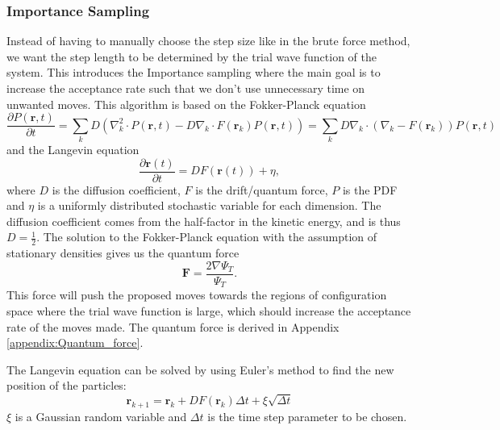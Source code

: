 \documentclass[12pt,a4paper,english]{article}
\begin{document}
\subsubsection{Importance Sampling}
\label{subsubsect:Importance}
Instead of having to manually choose the step size like in the brute force method, we want the step length to be determined by the trial wave function of the system. This introduces the Importance sampling where the main goal is to increase the acceptance rate such that we don't use unnecessary time on unwanted moves. This algorithm is based on the Fokker-Planck equation 
\begin{equation}
\label{eq:Fokker-Planck}
\frac{\partial P(\textbf{r},t)}{\partial t}=\sum_{k}D\left(\nabla_k^2\cdot P(\textbf{r},t)-D\nabla_k\cdot F(\textbf{r}_k)P(\textbf{r},t)\right)=\sum_{k}D\nabla_k\cdot(\nabla_k-F(\textbf{r}_k))P(\textbf{r},t)
\end{equation}
and the Langevin equation
\begin{equation}
\label{eq:Langevin}
\frac{\partial \textbf{r}(t)}{\partial t}=DF(\textbf{r}(t))+\eta,
\end{equation}
where $D$ is the diffusion coefficient, $F$ is the drift/quantum force, $P$ is the PDF and $\eta$ is a uniformly distributed stochastic variable for each dimension. The diffusion coefficient comes from the half-factor in the kinetic energy, and is thus $D=\frac{1}{2}$. The solution to the Fokker-Planck equation with the assumption of stationary densities gives us the quantum force
\begin{equation}
\label{eq:Quantum_force}
\textbf{F}=\frac{2\nabla \Psi_T}{\Psi_T}.
\end{equation}
This force will push the proposed moves towards the regions of configuration space where the trial wave function is large, which should increase the acceptance rate of the moves made. The quantum force is derived in Appendix \ref{appendix:Quantum_force}.

The Langevin equation can be solved by using Euler's method to find the new position of the particles:
\begin{equation}
\label{eq:Langevin_Euler}
\textbf{r}_{k+1}=\textbf{r}_k+DF(\textbf{r}_k)\Delta t+\xi\sqrt{\Delta t}
\end{equation}
$\xi$ is a Gaussian random variable and $\Delta t$ is the time step parameter to be chosen.
\end{document}
